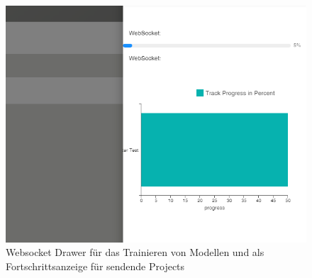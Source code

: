 \begin{figure}[h]
    \centering
    \includegraphics[width=0.9\linewidth]{includes/figures/new_version/websocket_model_training.png}
    \caption{Websocket Drawer für das Trainieren von Modellen und als Fortschrittsanzeige für sendende Projects}
\label{fig:websocket_sending_projects}
\end{figure}




